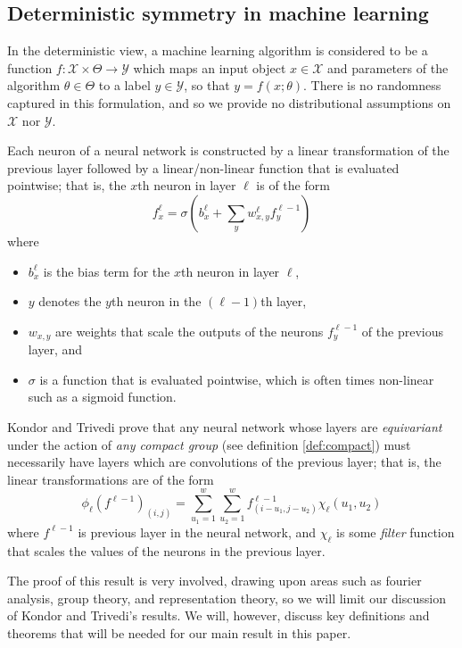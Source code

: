 \subsection{Deterministic symmetry in machine learning}
In the deterministic view, a machine learning algorithm is considered to be a function $f: \mathcal{X} \times \Theta \to \mathcal{Y}$ which maps an input object $x \in \mathcal{X}$ and parameters of the algorithm $\theta \in \Theta$ to a label $y \in \mathcal{Y}$, so that $y = f(x;\theta)$.
There is no randomness captured in this formulation, and so we provide no distributional assumptions on $\mathcal{X}$ nor $\mathcal{Y}$.

Each neuron of a neural network is constructed by a linear transformation of the previous layer followed by a linear/non-linear function that is evaluated pointwise; that is, the $x$th neuron in layer $\ell$ is of the form
$$
	f_{x}^{\ell} = \sigma \left( b_{x}^{\ell} + \sum_{y} w_{x,y}^{\ell} f_{y}^{\ell - 1} \right)
$$
where
\begin{itemize}
\item
$b_x^{\ell}$ is the bias term for the $x$th neuron in layer $\ell$,
\item
$y$ denotes the $y$th neuron in the $(\ell-1)$th layer,
\item 
$w_{x,y}$ are weights that scale the outputs of the neurons $f_y^{\ell - 1}$ of the previous layer, and
\item
$\sigma$ is a function that is evaluated pointwise, which is often times non-linear such as a sigmoid function.
\end{itemize} 
 
Kondor and Trivedi \cite{kondor2018generalization} prove that any neural network whose layers are \textit{equivariant} under the action of \textit{any compact group} (see definition \ref{def:compact}) must necessarily have layers which are convolutions of the previous layer; that is, the linear transformations are of the form
$$
	\phi_{\ell}(f^{\ell - 1})_{(i,j)} = \sum_{u_1 = 1}^{w} \sum_{u_2 = 1}^w f^{\ell - 1}_{(i - u_1, j - u_2)} \chi_{\ell}(u_1,u_2)
$$
where $f^{\ell-1}$ is previous layer in the neural network, and $\chi_{\ell}$ is some \textit{filter} function that scales the values of the neurons in the previous layer.

The proof of this result is very involved, drawing upon areas such as fourier analysis, group theory, and representation theory, so we will limit our discussion of Kondor and Trivedi's results.
We will, however, discuss key definitions and theorems that will be needed for our main result in this paper. 

